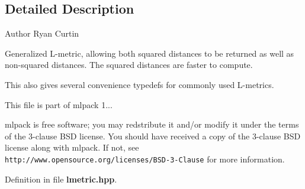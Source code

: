 \subsection{Detailed Description}
\begin{DoxyAuthor}{Author}
Ryan Curtin
\end{DoxyAuthor}
Generalized L-\/metric, allowing both squared distances to be returned as well as non-\/squared distances. The squared distances are faster to compute.

This also gives several convenience typedefs for commonly used L-\/metrics.

This file is part of mlpack 1...

mlpack is free software; you may redstribute it and/or modify it under the terms of the 3-\/clause B\-S\-D license. You should have received a copy of the 3-\/clause B\-S\-D license along with mlpack. If not, see {\tt http\-://www.\-opensource.\-org/licenses/\-B\-S\-D-\/3-\/\-Clause} for more information. 

Definition in file {\bf lmetric.\-hpp}.

